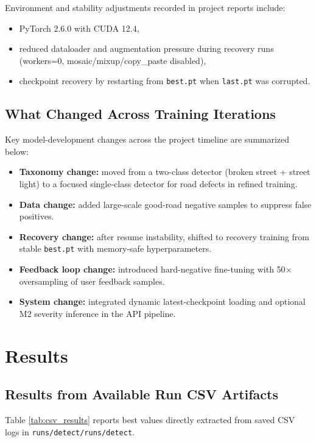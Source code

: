 \documentclass[twocolumn]{article}
\begin{document}
Environment and stability adjustments recorded in project reports include:
\begin{itemize}
    \item PyTorch 2.6.0 with CUDA 12.4,
    \item reduced dataloader and augmentation pressure during recovery runs (workers=0, mosaic/mixup/copy\_paste disabled),
    \item checkpoint recovery by restarting from \texttt{best.pt} when \texttt{last.pt} was corrupted.
\end{itemize}

\subsection{What Changed Across Training Iterations}
Key model-development changes across the project timeline are summarized below:
\begin{itemize}
    \item \textbf{Taxonomy change:} moved from a two-class detector (broken street + street light) to a focused single-class detector for road defects in refined training.
    \item \textbf{Data change:} added large-scale good-road negative samples to suppress false positives.
    \item \textbf{Recovery change:} after resume instability, shifted to recovery training from stable \texttt{best.pt} with memory-safe hyperparameters.
    \item \textbf{Feedback loop change:} introduced hard-negative fine-tuning with 50$\times$ oversampling of user feedback samples.
    \item \textbf{System change:} integrated dynamic latest-checkpoint loading and optional M2 severity inference in the API pipeline.
\end{itemize}

\section{Results}
\subsection{Results from Available Run CSV Artifacts}
Table \ref{tab:csv_results} reports best values directly extracted from saved CSV logs in \texttt{runs/detect/runs/detect}.
\end{document}
